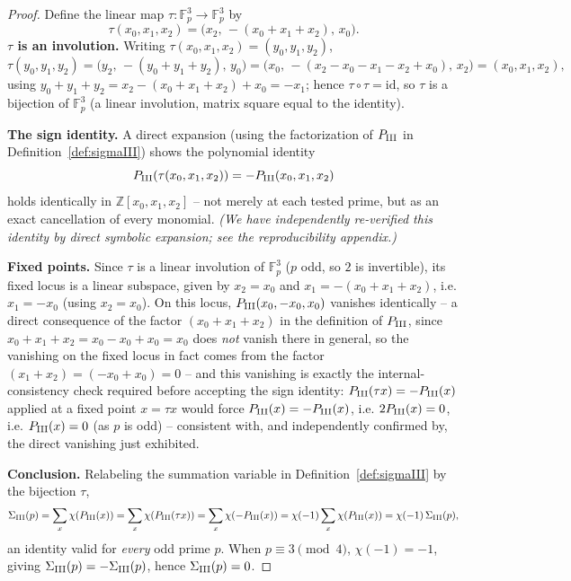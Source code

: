 \documentclass[11pt]{amsart}
\theoremstyle{definition}
\newcommand{\Fp}{\mathbb{F}_p}
\newcommand{\Z}{\mathbb{Z}}
\begin{document}
\begin{proof}
Define the linear map $\tau:\Fp^3\to\Fp^3$ by
\[
\tau(x_0,x_1,x_2) = \bigl(x_2,\,-(x_0+x_1+x_2),\,x_0\bigr).
\]
\textbf{$\tau$ is an involution.} Writing $\tau(x_0,x_1,x_2)=(y_0,y_1,y_2)$,
\[
\tau(y_0,y_1,y_2) = \bigl(y_2,\,-(y_0+y_1+y_2),\,y_0\bigr) =
\bigl(x_0,\,-(x_2-x_0-x_1-x_2+x_0),\,x_2\bigr)=(x_0,x_1,x_2),
\]
using $y_0+y_1+y_2 = x_2-(x_0+x_1+x_2)+x_0=-x_1$; hence $\tau\circ\tau=\mathrm{id}$,
so $\tau$ is a bijection of $\Fp^3$ (a linear involution, matrix square
equal to the identity).

\textbf{The sign identity.} A direct expansion (using the factorization
of $P_{\rm III}$ in Definition~\ref{def:sigmaIII}) shows the polynomial
identity
\[
P_{\rm III}(\tau(x_0,x_1,x_2)) = -P_{\rm III}(x_0,x_1,x_2)
\]
holds identically in $\Z[x_0,x_1,x_2]$ -- not merely at each tested prime,
but as an exact cancellation of every monomial. \emph{(We have independently
re-verified this identity by direct symbolic expansion; see the
reproducibility appendix.)}

\textbf{Fixed points.} Since $\tau$ is a linear involution of $\Fp^3$
($p$ odd, so $2$ is invertible), its fixed locus is a linear subspace,
given by $x_2=x_0$ and $x_1=-(x_0+x_1+x_2)$, i.e. $x_1=-x_0$ (using
$x_2=x_0$). On this locus, $P_{\rm III}(x_0,-x_0,x_0)$ vanishes
identically -- a direct consequence of the factor $(x_0+x_1+x_2)$ in the
definition of $P_{\rm III}$, since $x_0+x_1+x_2=x_0-x_0+x_0=x_0$ does
\emph{not} vanish there in general, so the vanishing on the fixed locus
in fact comes from the factor $(x_1+x_2)=(-x_0+x_0)=0$ -- and this
vanishing is exactly the internal-consistency check required before
accepting the sign identity: $P_{\rm III}(\tau x)=-P_{\rm III}(x)$
applied at a fixed point $x=\tau x$ would force $P_{\rm III}(x)=-P_{\rm
III}(x)$, i.e. $2P_{\rm III}(x)=0$, i.e. $P_{\rm III}(x)=0$ (as $p$ is
odd) -- consistent with, and independently confirmed by, the direct
vanishing just exhibited.

\textbf{Conclusion.} Relabeling the summation variable in
Definition~\ref{def:sigmaIII} by the bijection $\tau$,
\[
\Sigma_{\rm III}(p) = \sum_{x}\chi(P_{\rm III}(x)) =
\sum_{x}\chi(P_{\rm III}(\tau x)) = \sum_x\chi(-P_{\rm III}(x)) =
\chi(-1)\sum_x\chi(P_{\rm III}(x)) = \chi(-1)\,\Sigma_{\rm III}(p),
\]
an identity valid for \emph{every} odd prime $p$. When $p\equiv3\pmod4$,
$\chi(-1)=-1$, giving $\Sigma_{\rm III}(p)=-\Sigma_{\rm III}(p)$, hence
$\Sigma_{\rm III}(p)=0$.
\end{proof}
\end{document}
